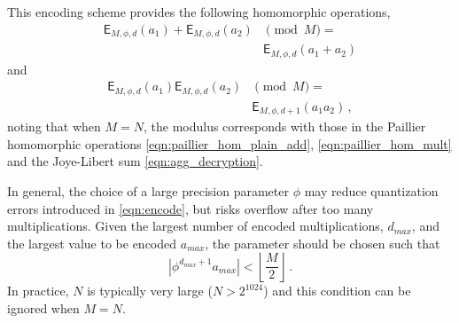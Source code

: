 \documentclass[10pt,letterpaper,oneside,twocolumn,journal]{IEEEtran}
\theoremstyle{definition}
\theoremstyle{definition}
\theoremstyle{remark}
\begin{document}
This encoding scheme provides the following homomorphic operations,
\begin{equation}
    \begin{split}
        \mathsf{E}_{M,\phi,d}(a_1) + \mathsf{E}_{M,\phi,d}(a_2)& \pmod{M} =\\
        &\mathsf{E}_{M,\phi,d}(a_1+a_2)
    \end{split}\label{eqn:encoding_homomorphic_add}
\end{equation}
and
\begin{equation}
    \begin{split}
        \mathsf{E}_{M,\phi,d}(a_1)\mathsf{E}_{M,\phi,d}(a_2)& \pmod{M} =\\
        &\mathsf{E}_{M,\phi,d+1}(a_1a_2)\,,
    \end{split}
\end{equation}
noting that when $M=N$, the modulus corresponds with those in the Paillier homomorphic operations \eqref{eqn:paillier_hom_plain_add}, \eqref{eqn:paillier_hom_mult} and the Joye-Libert sum \eqref{eqn:agg_decryption}.

In general, the choice of a large precision parameter $\phi$ may reduce quantization errors introduced in \eqref{eqn:encode}, but risks overflow after too many multiplications. Given the largest number of encoded multiplications, $d_{max}$, and the largest value to be encoded $a_{max}$, the parameter should be chosen such that
\begin{equation}
    \left|\phi^{d_{max}+1}a_{max}\right| < \left\lfloor \frac{M}{2} \right\rfloor\,.
\end{equation}
In practice, $N$ is typically very large ($N>2^{1024}$) and this condition can be ignored when $M=N$.

% 
%                                            
%                                            
%                                            
% 
\end{document}
